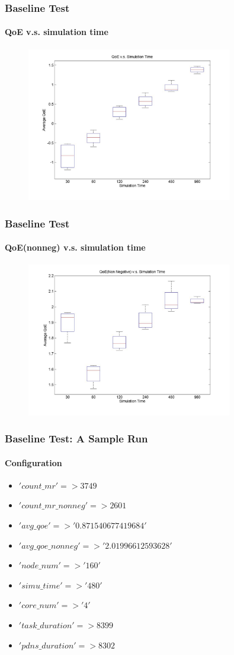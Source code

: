 \documentclass[14pt]{beamer}
\begin{document}
\begin{frame}
\frametitle{Baseline Test}
\framesubtitle{QoE v.s. simulation time}
\begin{figure}
	\includegraphics[width=0.8\textwidth]{../fig/simutime_qoe.jpg}
\end{figure}
\end{frame}

\begin{frame}
\frametitle{Baseline Test}
\framesubtitle{QoE(nonneg) v.s. simulation time}
\begin{figure}
	\includegraphics[width=0.8\textwidth]{../fig/simutime_qoe_nonneg.jpg}
\end{figure}
\end{frame}

\begin{frame}
\frametitle{Baseline Test: A Sample Run}
\framesubtitle{Configuration}
\begin{itemize}
      \item     $'count\_mr' => 3749$
      \item     $'count\_mr\_nonneg' => 2601$
      \item     $'avg\_qoe' => '0.871540677419684'$
      \item     $'avg\_qoe\_nonneg' => '2.01996612593628'$
      \item     $'node\_num' => '160'$
      \item     $'simu\_time' => '480'$
      \item     $'core\_num' => '4'$
      \item     $'task\_duration' => 8399$
      \item     $'pdns\_duration' => 8302$
\end{itemize}
\end{frame}
\end{document}
